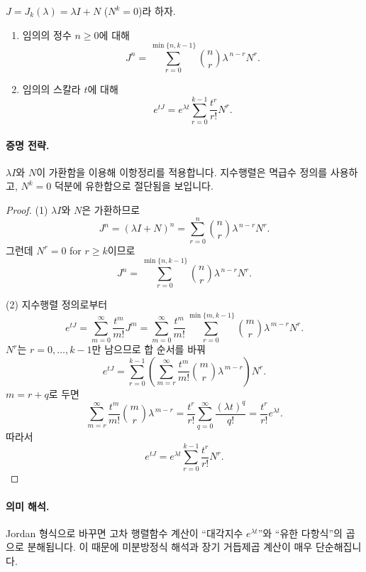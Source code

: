 \begin{theorem}
$J=J_k(\lambda)=\lambda I+N$ ($N^k=0$)라 하자.
\begin{enumerate}[label=(\arabic*)]
\item 임의의 정수 $n\ge0$에 대해
$$
J^n=\sum_{r=0}^{\min\{n,k-1\}}\binom{n}{r}\lambda^{\,n-r}N^r.
$$
\item 임의의 스칼라 $t$에 대해
$$
e^{tJ}=e^{\lambda t}\sum_{r=0}^{k-1}\frac{t^r}{r!}N^r.
$$
\end{enumerate}
\end{theorem}

\paragraph{증명 전략.}
$\lambda I$와 $N$이 가환함을 이용해 이항정리를 적용합니다. 지수행렬은 멱급수 정의를 사용하고, $N^k=0$ 덕분에 유한합으로 절단됨을 보입니다.

\begin{proof}
(1) $\lambda I$와 $N$은 가환하므로
$$
J^n=(\lambda I+N)^n=\sum_{r=0}^n \binom{n}{r}\lambda^{\,n-r}N^r.
$$
그런데 $N^r=0$ for $r\ge k$이므로
$$
J^n=\sum_{r=0}^{\min\{n,k-1\}}\binom{n}{r}\lambda^{\,n-r}N^r.
$$

(2) 지수행렬 정의로부터
$$
e^{tJ}=\sum_{m=0}^\infty \frac{t^m}{m!}J^m
=\sum_{m=0}^\infty \frac{t^m}{m!}\sum_{r=0}^{\min\{m,k-1\}}\binom{m}{r}\lambda^{\,m-r}N^r.
$$
$N^r$는 $r=0,\dots,k-1$만 남으므로 합 순서를 바꿔
$$
e^{tJ}
=\sum_{r=0}^{k-1}\left(\sum_{m=r}^\infty \frac{t^m}{m!}\binom{m}{r}\lambda^{\,m-r}\right)N^r.
$$
$m=r+q$로 두면
$$
\sum_{m=r}^\infty \frac{t^m}{m!}\binom{m}{r}\lambda^{\,m-r}
=\frac{t^r}{r!}\sum_{q=0}^\infty \frac{(\lambda t)^q}{q!}
=\frac{t^r}{r!}e^{\lambda t}.
$$
따라서
$$
e^{tJ}=e^{\lambda t}\sum_{r=0}^{k-1}\frac{t^r}{r!}N^r.
$$
\end{proof}

\paragraph{의미 해석.}
Jordan 형식으로 바꾸면 고차 행렬함수 계산이 ``대각지수 $e^{\lambda t}$''와 ``유한 다항식''의 곱으로 분해됩니다. 이 때문에 미분방정식 해석과 장기 거듭제곱 계산이 매우 단순해집니다.

